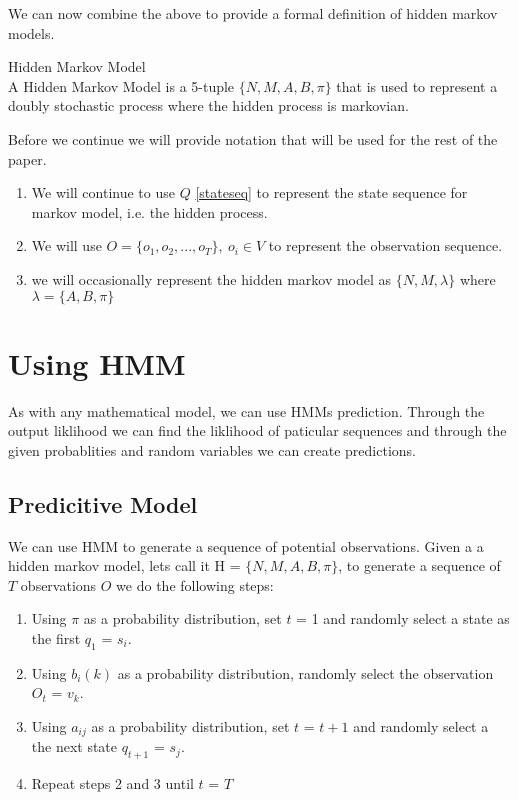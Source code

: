 We can now combine the above to provide a formal definition of hidden markov models.
\begin{definition}
\label{hmm} Hidden Markov Model \\
A Hidden Markov Model is a 5-tuple $\{N,M,A,B,\pi \}$ that is used to represent a doubly stochastic process where the hidden process is markovian. 
\end{definition}

Before we continue we will provide notation that will be used for the rest of the paper.
\begin{enumerate}[i]
    \item We will continue to use $Q$ \ref{stateseq} to represent the state sequence for markov model, i.e. the hidden process.
    \item We will use $O = \{o_1,o_2,...,o_T\} ,\ o_i \in V$ to represent the observation sequence.
    \item we will occasionally represent the hidden markov model as $\{N,M, \lambda \}$ where $\lambda = \{A, B, \pi\}$ 
\end{enumerate}


\section{Using HMM}
As with any mathematical model, we can use HMMs prediction. Through the output liklihood we can find the liklihood of paticular sequences and through the given probablities and random variables we can create predictions. 

\subsection{Predicitive Model}
 We can use HMM to generate a sequence of potential observations. Given a a hidden markov model, lets call it H = $\{N,M,A,B,\pi\}$, to generate a sequence of $T$ observations $O$ we do the following steps:
 \begin{enumerate}
    \label{hmmpredict}
     \item Using $\pi$ as a probability distribution, set $t$ = 1 and randomly select a state as the first $q_1$ = $s_i$.
     \item Using $b_i(k)$ as a probability distribution, randomly select the observation $O_t$ = $v_k$.
     \item Using $a_{ij}$ as a probability distribution, set $t$ = $t+1$ and randomly select a the next state $q_{t+1}$ = $s_j$.
     \item Repeat steps 2 and 3 until $t$ = $T$
 \end{enumerate}

